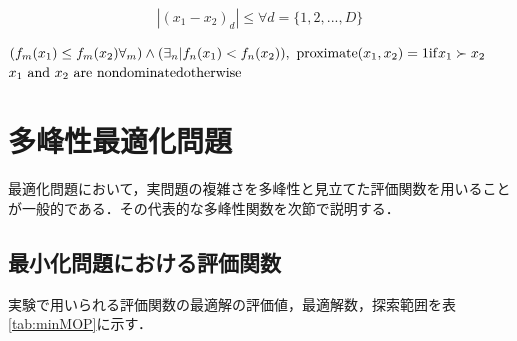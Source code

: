 \documentclass[a4j,11pt]{jarticle}
\begin{document}
\begin{equation}
|(x_1-x_2)_d| \leq \forall d = \{1,2,...,D\}
\end{equation}


$(f_m(x_1) \leq f_m(x_2) \forall_m) \wedge (\exists_n | f_n(x_1) < f_n(x_2)), \ {\rm proximate}(x_1, x_2) = 1   {\rm if }  x_1 \succ x_2 $ \\
$x_1 \ {\rm and} \ x_2 \ {\rm are \ non dominated}  {\rm otherwise}$




\newpage
\section{多峰性最適化問題}
\label{sec:MOP}
最適化問題において，実問題の複雑さを多峰性と見立てた評価関数を用いることが一般的である．その代表的な多峰性関数を次節で説明する．


\subsection{最小化問題における評価関数}
\label{ss:MinFunc}
実験で用いられる評価関数の最適解の評価値，最適解数，探索範囲を表\ref{tab:minMOP}に示す．
\end{document}

